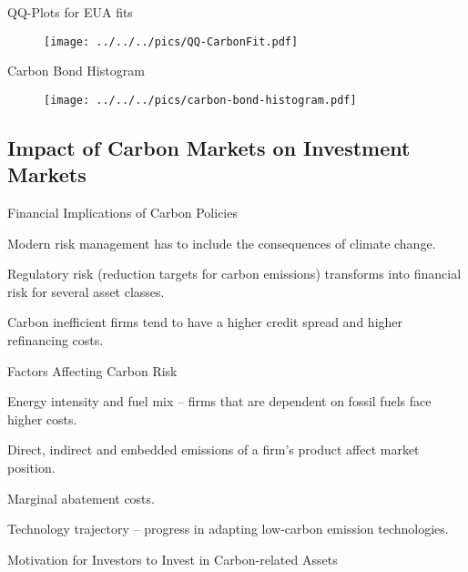 {QQ-Plots for EUA fits}
\begin{figure}[h!]
\centering
\texttt{[image: ../../../pics/QQ-CarbonFit.pdf]}
\label{fig:EUA-fits}
\end{figure}

{Carbon Bond Histogram}
\begin{figure}[h!]
\centering
\texttt{[image: ../../../pics/carbon-bond-histogram.pdf]}
\label{fig:Carbon-Bond-Histogram}
\end{figure}

\subsection{Impact of Carbon Markets on Investment Markets}

{Financial Implications of Carbon Policies}




\item<1-> Modern risk management has to include the consequences of climate change.
\item<2-> Regulatory risk (reduction targets for carbon emissions) transforms into financial risk  for several asset classes.
\item<3-> Carbon inefficient firms tend to have a higher credit spread and higher refinancing costs.





{Factors Affecting Carbon Risk}




\item<1-> Energy intensity and fuel mix -- firms that are dependent on fossil fuels face higher costs.
\item<2-> Direct, indirect and embedded emissions of a firm's product affect market position.
\item<3-> Marginal abatement costs.
\item<4-> Technology trajectory -- progress in adapting low-carbon emission technologies.





{Motivation for Investors to Invest in Carbon-related Assets}




